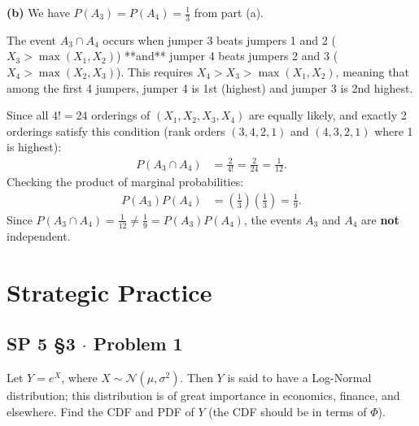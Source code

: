 \documentclass[11pt,a4paper]{article}
\begin{document}
\vspace{4pt}
\noindent \textbf{(b)} We have $P(A_3) = P(A_4) = \frac{1}{3}$ from part (a). 

The event $A_3 \cap A_4$ occurs when jumper 3 beats jumpers 1 and 2 ($X_3 > \max(X_1, X_2)$) **and** jumper 4 beats jumpers 2 and 3 ($X_4 > \max(X_2, X_3)$). This requires $X_4 > X_3 > \max(X_1, X_2)$, meaning that among the first 4 jumpers, jumper 4 is 1st (highest) and jumper 3 is 2nd highest. 

Since all $4! = 24$ orderings of $(X_1, X_2, X_3, X_4)$ are equally likely, and exactly 2 orderings satisfy this condition (rank orders $(3,4,2,1)$ and $(4,3,2,1)$ where 1 is highest):
\begin{align*}
P(A_3 \cap A_4) &= \frac{2}{4!} = \frac{2}{24} = \frac{1}{12}.
\end{align*}
Checking the product of marginal probabilities:
\begin{align*}
P(A_3) P(A_4) &= \left(\frac{1}{3}\right)\left(\frac{1}{3}\right) = \frac{1}{9}.
\end{align*}
Since $P(A_3 \cap A_4) = \frac{1}{12} \neq \frac{1}{9} = P(A_3) P(A_4)$, the events $A_3$ and $A_4$ are \textbf{not} independent.

\vspace{15pt}
\section{Strategic Practice}

\subsection{SP 5 \S3 $\cdot$ Problem 1}
\begin{tcolorbox}[title={SP 5 \S3 $\cdot$ Problem 1}]
Let $Y = e^X$, where $X \sim \mathcal{N}(\mu, \sigma^2)$. Then $Y$ is said to have a Log-Normal distribution; this distribution is of great importance in economics, finance, and elsewhere. Find the CDF and PDF of $Y$ (the CDF should be in terms of $\Phi$).
\end{tcolorbox}
\end{document}
